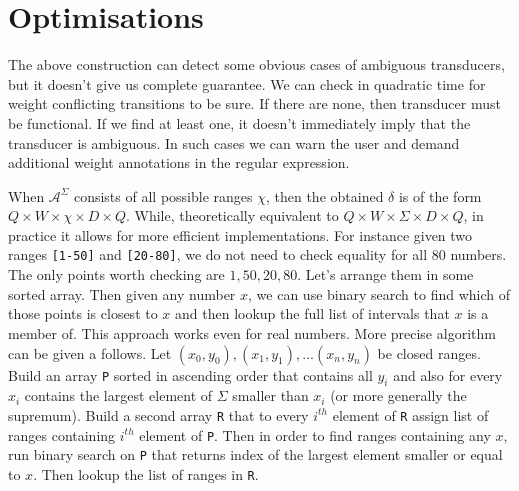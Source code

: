 \section{Optimisations}

The above construction can detect some obvious cases of ambiguous transducers, but it doesn't give us complete guarantee. We can check in quadratic time\cite{Marie-Pierre} for weight conflicting transitions to be sure. If there are none, then transducer must be functional. If we find at least one, it doesn't immediately imply that the transducer is ambiguous. In such cases we can warn the user and demand additional weight annotations in the regular expression. 

When $\mathcal{A}^\Sigma$ consists of all possible ranges  $\chi$, then the obtained $\delta$ is of the form $Q\times  W \times \chi \times D \times Q$. While, theoretically equivalent to $Q\times  W \times \Sigma \times D \times Q$, in practice it allows for more efficient implementations. For instance given two ranges \texttt{[1-50]} and \texttt{[20-80]}, we do not need to check equality for all $80$ numbers. The only points worth checking are $1,50,20,80$. Let's arrange them in some sorted array. Then given any number $x$, we can use binary search to find which of those points is closest to $x$ and then lookup the full list of intervals that $x$ is a member of. This approach works even for real numbers. More precise algorithm can be given a follows. Let $(x_0,y_0),(x_1,y_1),...(x_n,y_n)$ be closed ranges. Build an array \texttt{P} sorted in ascending order that contains all $y_i$ and also for every $x_i$ contains the largest element of $\Sigma$ smaller than $x_i$ (or more generally the supremum). Build a second array \texttt{R} that to every $i^{th}$ element of \texttt{R} assign list of ranges containing  $i^{th}$ element of \texttt{P}. Then in order to find ranges containing any $x$, run binary search on \texttt{P} that returns index of the largest element smaller or equal to $x$. Then lookup the list of ranges in \texttt{R}. 



